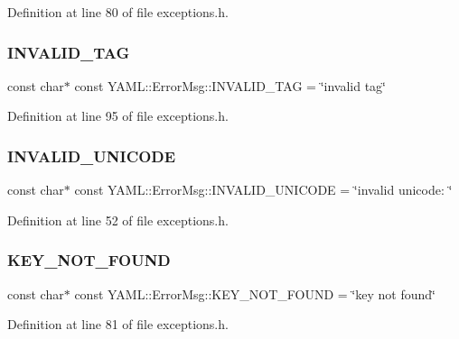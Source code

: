 Definition at line 80 of file exceptions.\+h.

\mbox{\label{namespace_y_a_m_l_1_1_error_msg_a6a60bebf8c932e09252b4bf898e09316}} 
\subsubsection{\texorpdfstring{INVALID\_TAG}{INVALID\_TAG}}
{\footnotesize\ttfamily const char$\ast$ const Y\+A\+M\+L\+::\+Error\+Msg\+::\+I\+N\+V\+A\+L\+I\+D\+\_\+\+T\+AG = \char`\"{}invalid tag\char`\"{}}



Definition at line 95 of file exceptions.\+h.

\mbox{\label{namespace_y_a_m_l_1_1_error_msg_a7d6b41ffeb421ff626a13599b331a957}} 
\subsubsection{\texorpdfstring{INVALID\_UNICODE}{INVALID\_UNICODE}}
{\footnotesize\ttfamily const char$\ast$ const Y\+A\+M\+L\+::\+Error\+Msg\+::\+I\+N\+V\+A\+L\+I\+D\+\_\+\+U\+N\+I\+C\+O\+DE = \char`\"{}invalid unicode\+: \char`\"{}}



Definition at line 52 of file exceptions.\+h.

\mbox{\label{namespace_y_a_m_l_1_1_error_msg_a8f71004902c48f0ca0a471c73bc483c7}} 
\subsubsection{\texorpdfstring{KEY\_NOT\_FOUND}{KEY\_NOT\_FOUND}}
{\footnotesize\ttfamily const char$\ast$ const Y\+A\+M\+L\+::\+Error\+Msg\+::\+K\+E\+Y\+\_\+\+N\+O\+T\+\_\+\+F\+O\+U\+ND = \char`\"{}key not found\char`\"{}}



Definition at line 81 of file exceptions.\+h.

